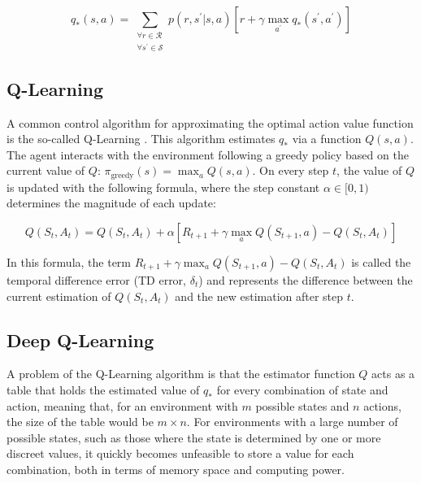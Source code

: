 \begin{equation}
    q_\ast(s,a) = \sum_{\substack{\forall r \in \mathcal{R} \\ \forall s^\prime \in \mathcal{S}}}{p(r,s^\prime|s,a)[r + \gamma \max_{a^\prime} q_\ast(s^\prime,a^\prime)]}
\end{equation}

\subsection{Q-Learning}

A common control algorithm for approximating the optimal action value function is the so-called Q-Learning \cite{unk}. This algorithm estimates $q_\ast$ via a function $Q(s,a)$. The agent interacts with the environment following a greedy policy based on the current value of $Q$: $\pi_\textrm{greedy}(s) = \max_a Q(s,a)$. On every step $t$, the value of $Q$ is updated with the following formula, where the step constant $\alpha \in [0,1)$ determines the magnitude of each update:

\begin{equation}
    Q(S_t,A_t) = Q(S_t,A_t) + \alpha[R_{t+1} + \gamma \max_a Q(S_{t+1},a) - Q(S_t,A_t)]
\end{equation}

In this formula, the term $R_{t+1} + \gamma \max_a Q(S_{t+1},a) - Q(S_t,A_t)$ is called the temporal difference error (TD error, $\delta_t$) and represents the difference between the current estimation of $Q(S_t,A_t)$ and the new estimation after step $t$.

\subsection{Deep Q-Learning}

A problem of the Q-Learning algorithm is that the estimator function $Q$ acts as a table that holds the estimated value of $q_\ast$ for every combination of state and action, meaning that, for an environment with $m$ possible states and $n$ actions, the size of the table would be $m \times n$. For environments with a large number of possible states, such as those where the state is determined by one or more discreet values, it quickly becomes unfeasible to store a value for each combination, both in terms of memory space and computing power.

